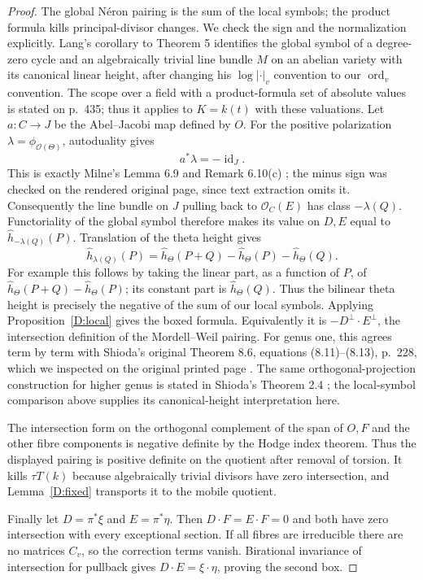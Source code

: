 \begin{proof}
The global N\'eron pairing is the sum of the local symbols; the product
formula kills principal-divisor changes.  We check the sign and the
normalization explicitly.  Lang's corollary to Theorem 5
\cite[p.~441]{LangHeights1964} identifies the global symbol of a
degree-zero cycle and an algebraically trivial line bundle $M$ on an
abelian variety with its canonical linear height, after changing his
$\log|\cdot|_v$ convention to our $\operatorname{ord}_v$ convention.
The scope over a field with a product-formula set of absolute values is
stated on p.~435; thus it applies to $K=k(t)$ with these valuations.
Let $a:C\to J$ be the Abel--Jacobi map defined by $O$.  For the positive
polarization $\lambda=\phi_{\mathcal O(\Theta)}$, autoduality gives
\[
             a^*\lambda=-\operatorname{id}_J.
\]
This is exactly Milne's Lemma 6.9 and Remark 6.10(c)
\cite[p.~23]{MilneJV}; the minus sign was checked on the rendered original
page, since text extraction omits it.  Consequently the line bundle on
$J$ pulling back to $\mathcal O_C(E)$ has class $-\lambda(Q)$.
Functoriality of the global symbol therefore makes its value on $D,E$
equal to $\widehat h_{-\lambda(Q)}(P)$.  Translation of the theta height
gives
\[
 \widehat h_{\lambda(Q)}(P)
  =\widehat h_\Theta(P+Q)-\widehat h_\Theta(P)-\widehat h_\Theta(Q).
\]
For example this follows by taking the linear part, as a function of
$P$, of $\widehat h_\Theta(P+Q)-\widehat h_\Theta(P)$; its constant part
is $\widehat h_\Theta(Q)$.  Thus the bilinear theta height is precisely
the negative of the sum of our local symbols.  Applying
Proposition~\ref{D:local} gives the boxed formula.
Equivalently it is $-D^\perp\cdot E^\perp$, the
intersection definition of the Mordell--Weil pairing.  For genus one,
this agrees term by term with Shioda's original Theorem 8.6,
equations (8.11)--(8.13), p.~228, which we inspected on the original
printed page \cite{Shioda1990}.  The same orthogonal-projection
construction for higher genus is stated in Shioda's Theorem 2.4
\cite[p.~248]{Shioda1992}; the local-symbol comparison above supplies its
canonical-height interpretation here.

The intersection form on the orthogonal complement of the span of
$O,F$ and the other fibre components is negative definite by the Hodge
index theorem.  Thus the displayed pairing is positive definite on the
quotient after removal of torsion.  It kills $\tau T(k)$ because
algebraically trivial divisors have zero intersection, and
Lemma~\ref{D:fixed} transports it to the mobile quotient.

Finally let $D=\pi^*\xi$ and $E=\pi^*\eta$.  Then $D\cdot F=E\cdot F=0$
and both have zero intersection with every exceptional section.
If all fibres are irreducible there are no matrices $C_v$, so the
correction terms vanish.  Birational invariance of intersection for
pullback gives $D\cdot E=\xi\cdot\eta$, proving the second box.
\end{proof}

